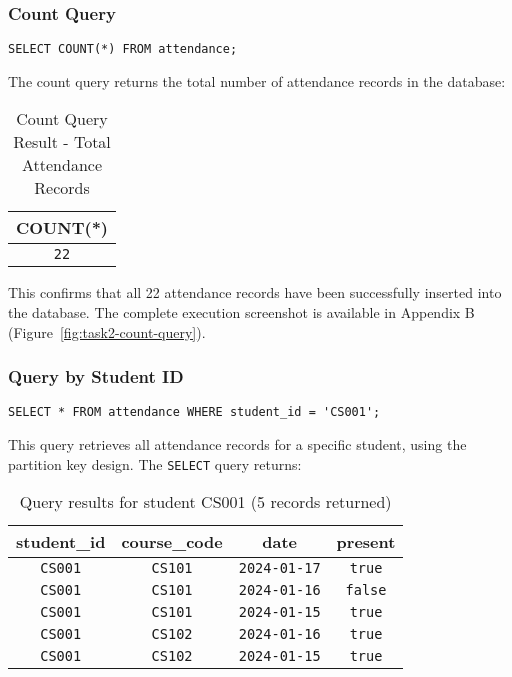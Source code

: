 \subsubsection{Count Query}
\begin{verbatim}
SELECT COUNT(*) FROM attendance;
\end{verbatim}

The count query returns the total number of attendance records in the database:

\begin{table}[H]
\centering
\begin{tabular}{|c|}
\hline
\textbf{COUNT(*)} \\
\hline
\texttt{22} \\
\hline
\end{tabular}
\caption{Count Query Result - Total Attendance Records}
\end{table}

This confirms that all 22 attendance records have been successfully inserted into the database. The complete execution screenshot is available in Appendix B (Figure~\ref{fig:task2-count-query}).

\subsubsection{Query by Student ID}
\begin{verbatim}
SELECT * FROM attendance WHERE student_id = 'CS001';
\end{verbatim}

This query retrieves all attendance records for a specific student, using the partition key design. The \texttt{SELECT} query returns:

\begin{table}[H]
  \centering
  \footnotesize
  \begin{tabular}{|c|c|c|c|}
    \hline
    \textbf{student\_id} & \textbf{course\_code} & \textbf{date} & \textbf{present} \\
    \hline
    \texttt{CS001}                & \texttt{CS101}                 & \texttt{2024-01-17}    & \texttt{true}             \\
    \texttt{CS001}                & \texttt{CS101}                 & \texttt{2024-01-16}    & \texttt{false}            \\
    \texttt{CS001}                & \texttt{CS101}                 & \texttt{2024-01-15}    & \texttt{true}             \\
    \texttt{CS001}                & \texttt{CS102}                 & \texttt{2024-01-16}    & \texttt{true}             \\
    \texttt{CS001}                & \texttt{CS102}                 & \texttt{2024-01-15}    & \texttt{true}             \\
    \hline
  \end{tabular}
  \caption{Query results for student CS001 (5 records returned)}
\end{table}

